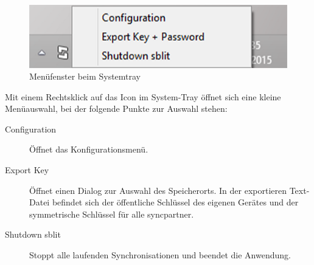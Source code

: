 \begin{figure}[H]
	\centering
	\includegraphics[]{images/systemtray.png}
  \caption{Menüfenster beim Systemtray}
\end{figure}

Mit einem Rechtsklick auf das Icon im System-Tray öffnet sich eine kleine Menüauswahl,
bei der folgende Punkte zur Auswahl stehen:

\begin{description}

	\item[{Configuration}]
		Öffnet das Konfigurationsmenü.

	\item[{Export Key}]
		Öffnet einen Dialog zur Auswahl des Speicherorts. In der exportieren Text-Datei befindet
		sich der öffentliche Schlüssel des eigenen Gerätes und der symmetrische Schlüssel für
		alle \gls{syncpartner}.

	\item[{Shutdown sblit}]
	  Stoppt alle laufenden Synchronisationen und beendet die Anwendung.
\end{description}
